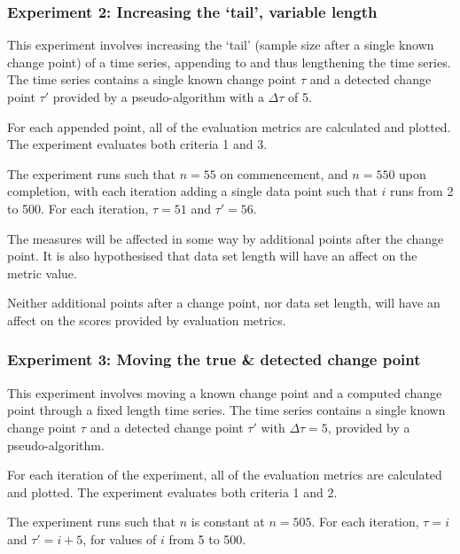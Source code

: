 \documentclass[../main.tex]{subfiles}
\begin{document}
\subsubsection{Experiment 2: Increasing the `tail', variable length}

This experiment involves increasing the `tail' (sample size after a single known change point) of a time series, appending to and thus lengthening the time series. The time series contains a single known change point $\tau$ and a detected change point $\tau'$ provided by a pseudo-algorithm with a $\Delta \tau$ of 5.

For each appended point, all of the evaluation metrics are calculated and plotted. The experiment evaluates both criteria 1 and 3.

The experiment runs such that $n=55$ on commencement, and $n=550$ upon completion, with each iteration adding a single data point such that $i$ runs from 2 to 500. For each iteration, $\tau = 51$ and $\tau' = 56$.

\begin{hypothesis}
    The measures will be affected in some way by additional points after the change point. It is also hypothesised that data set length will have an affect on the metric value.
\end{hypothesis}

\begin{nullhypothesis}
    Neither additional points after a change point, nor data set length, will have an affect on the scores provided by evaluation metrics.
\end{nullhypothesis}

\subsubsection{Experiment 3: Moving the true \& detected change point}

This experiment involves moving a known change point and a computed change point through a fixed length time series. The time series contains a single known change point $\tau$ and a detected change point $\tau'$ with $\Delta \tau = 5$, provided by a pseudo-algorithm.

For each iteration of the experiment, all of the evaluation metrics are calculated and plotted. The experiment evaluates both criteria 1 and 2.

The experiment runs such that $n$ is constant at $n=505$. For each iteration, $\tau = i$ and $\tau' = i + 5$, for values of $i$ from 5 to 500.
\end{document}
